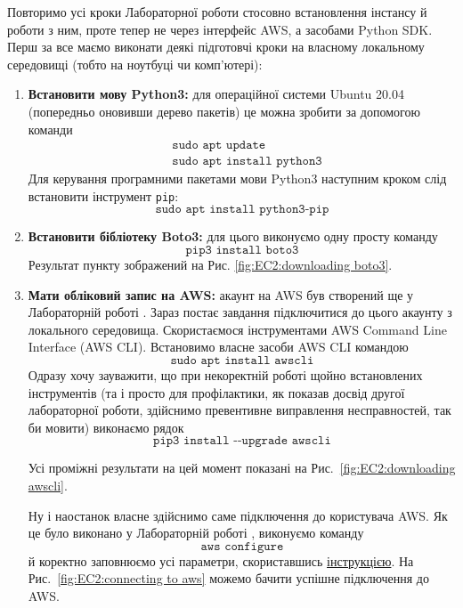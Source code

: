 \documentclass[a4paper,14pt]{extarticle} %
\begin{document}
Повторимо усі кроки Лабораторної роботи  стосовно встановлення інстансу й роботи з ним, проте тепер 
не через інтерфейс AWS, а засобами Python SDK. Перш за все маємо виконати деякі підготовчі кроки на власному 
локальному середовищі (тобто на ноутбуці чи комп'ютері):
\begin{enumerate}
    \item \textbf{Встановити мову Python3:} для операційної системи Ubuntu 20.04 (попередньо оновивши дерево пакетів) 
    це можна зробити за допомогою команди 
    \begin{align*}
        &\texttt{sudo apt update} \\
        &\texttt{sudo apt install python3}
    \end{align*}
    Для керування програмними пакетами мови Python3 наступним кроком слід встановити інструмент \texttt{pip}: 
    \[ \texttt{sudo apt install python3-pip} \]

    \item \textbf{Встановити бібліотеку Boto3:} для цього виконуємо одну просту команду 
    \[ \texttt{pip3 install boto3} \]
    Результат пункту зображений на Рис. \ref{fig:EC2:downloading boto3}.

    \item \textbf{Мати обліковий запис на AWS:} акаунт на AWS був створений ще у Лабораторній роботі . 
    Зараз постає завдання підключитися до цього акаунту з локального середовища. Скористаємося інструментами 
    AWS Command Line Interface (AWS CLI). Встановимо власне засоби AWS CLI командою
    \[ \texttt{sudo apt install awscli} \]
    Одразу хочу зауважити, що при некоректній роботі щойно встановлених інструментів (та і просто для профілактики, 
    як показав досвід другої лабораторної роботи, здійснимо превентивне виправлення несправностей, так би мовити) 
    виконаємо рядок
    \[ \texttt{pip3 install {-}{-}upgrade awscli} \]

    Усі проміжні результати на цей момент показані на Рис.~\ref{fig:EC2:downloading awscli}.

    Ну і наостанок власне здійснимо саме підключення до користувача AWS. Як це було виконано у Лабораторній 
    роботі , виконуємо команду 
    \[ \texttt{aws configure} \]
    й коректно заповнюємо усі параметри, скориставшись 
    \href{https://docs.aws.amazon.com/cli/latest/userguide/cli-configure-files.html}{інструкцією}. На 
    Рис.~\ref{fig:EC2:connecting to aws} можемо бачити успішне підключення до AWS.
\end{enumerate}
\end{document}

